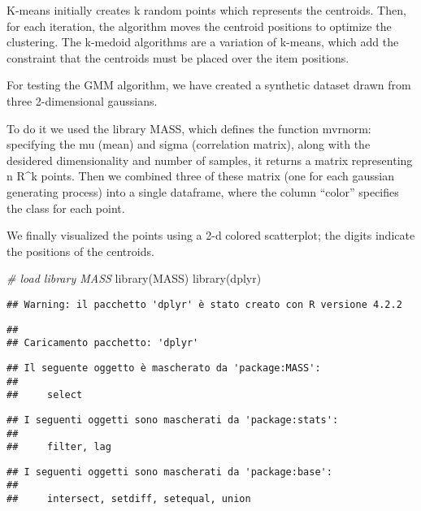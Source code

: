 \documentclass[
]{article}
\newenvironment{Shaded}{\begin{snugshade}}{\end{snugshade}}
\newcommand{\CommentTok}[1]{\textcolor[rgb]{0.56,0.35,0.01}{\textit{#1}}}
\newcommand{\FunctionTok}[1]{\textcolor[rgb]{0.00,0.00,0.00}{#1}}
\newcommand{\NormalTok}[1]{#1}
\begin{document}
K-means initially creates k random points which represents the
centroids. Then, for each iteration, the algorithm moves the centroid
positions to optimize the clustering. The k-medoid algorithms are a
variation of k-means, which add the constraint that the centroids must
be placed over the item positions.

For testing the GMM algorithm, we have created a synthetic dataset drawn
from three 2-dimensional gaussians.

To do it we used the library MASS, which defines the function mvrnorm:
specifying the mu (mean) and sigma (correlation matrix), along with the
desidered dimensionality and number of samples, it returns a matrix
representing n R\^{}k points. Then we combined three of these matrix
(one for each gaussian generating process) into a single dataframe,
where the column ``color'' specifies the class for each point.

We finally visualized the points using a 2-d colored scatterplot; the
digits indicate the positions of the centroids.

\begin{Shaded}
\begin{Highlighting}[]
\CommentTok{\# load library MASS}
\FunctionTok{library}\NormalTok{(MASS)}
\FunctionTok{library}\NormalTok{(dplyr)}
\end{Highlighting}
\end{Shaded}

\begin{verbatim}
## Warning: il pacchetto 'dplyr' è stato creato con R versione 4.2.2
\end{verbatim}

\begin{verbatim}
## 
## Caricamento pacchetto: 'dplyr'
\end{verbatim}

\begin{verbatim}
## Il seguente oggetto è mascherato da 'package:MASS':
## 
##     select
\end{verbatim}

\begin{verbatim}
## I seguenti oggetti sono mascherati da 'package:stats':
## 
##     filter, lag
\end{verbatim}

\begin{verbatim}
## I seguenti oggetti sono mascherati da 'package:base':
## 
##     intersect, setdiff, setequal, union
\end{verbatim}
\end{document}
